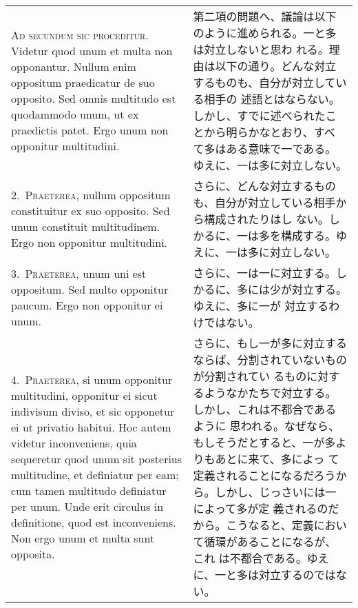 \documentclass[10pt]{jsarticle} %
\begin{document}
\begin{longtable}{p{21em}p{21em}}

{\huge A}{\scshape d secundum sic proceditur}. Videtur quod unum et multa non
opponantur. Nullum enim oppositum praedicatur de suo opposito. Sed omnis
multitudo est quodammodo unum, ut ex praedictis patet. Ergo unum non
opponitur multitudini.

&

第二項の問題へ、議論は以下のように進められる。一と多は対立しないと思わ
れる。理由は以下の通り。どんな対立するものも、自分が対立している相手の
述語とはならない。しかし、すでに述べられたことから明らかなとおり、すべ
て多はある意味で一である。ゆえに、一は多に対立しない。

\\

2.~{\scshape Praeterea}, nullum oppositum constituitur ex suo opposito. Sed unum
constituit multitudinem. Ergo non opponitur multitudini.

&

さらに、どんな対立するものも、自分が対立している相手から構成されたりはし
ない。しかるに、一は多を構成する。ゆえに、一は多に対立しない。

\\

3.~{\scshape Praeterea}, unum uni est oppositum. Sed multo opponitur paucum. Ergo non opponitur ei unum.

&

さらに、一は一に対立する。しかるに、多には少が対立する。ゆえに、多に一が
対立するわけではない。

\\

4.~{\scshape Praeterea}, si unum opponitur multitudini, opponitur ei sicut indivisum
diviso, et sic opponetur ei ut privatio habitui. Hoc autem videtur
inconveniens, quia sequeretur quod unum sit posterius multitudine, et
definiatur per eam; cum tamen multitudo definiatur per unum. Unde erit
circulus in definitione, quod est inconveniens. Non ergo unum et multa
sunt opposita.

&

さらに、もし一が多に対立するならば、分割されていないものが分割されてい
るものに対するようなかたちで対立する。しかし、これは不都合であるように
思われる。なぜなら、もしそうだとすると、一が多よりもあとに来て、多によっ
て定義されることになるだろうから。しかし、じっさいには一によって多が定
義されるのだから。こうなると、定義において循環があることになるが、これ
は不都合である。ゆえに、一と多は対立するのではない。


\end{longtable}
\end{document}
